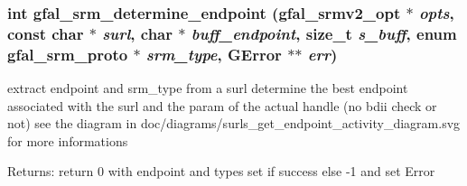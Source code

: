 \subsubsection{\setlength{\rightskip}{0pt plus 5cm}int gfal\_\-srm\_\-determine\_\-endpoint (gfal\_\-srmv2\_\-opt $\ast$ {\em opts}, const char $\ast$ {\em surl}, char $\ast$ {\em buff\_\-endpoint}, size\_\-t {\em s\_\-buff}, enum gfal\_\-srm\_\-proto $\ast$ {\em srm\_\-type}, GError $\ast$$\ast$ {\em err})}\label{gfal__common__srm__endpoint_8c_e0b7b0c302d9d514df5518cbf8b4c215}


extract endpoint and srm\_\-type from a surl determine the best endpoint associated with the surl and the param of the actual handle (no bdii check or not) see the diagram in doc/diagrams/surls\_\-get\_\-endpoint\_\-activity\_\-diagram.svg for more informations 

\begin{Desc}
\item[Returns:]return 0 with endpoint and types set if success else -1 and set Error \end{Desc}
